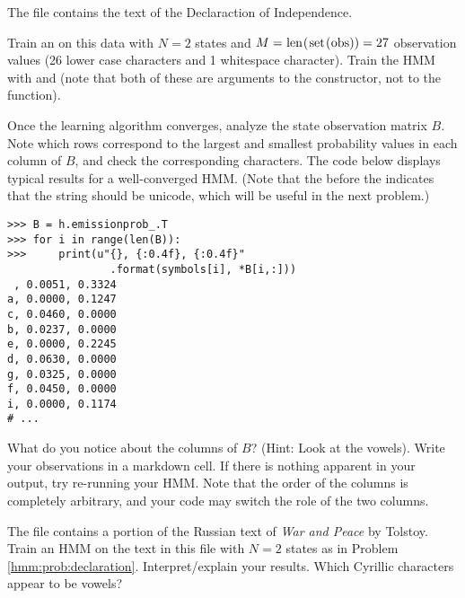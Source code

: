 \begin{problem}\label{hmm:prob:declaration}
The file  contains the text of the Declaraction of Independence.

Train an  on this data with $N=2$ states and $M=\text{\li{len(set(obs))}}=27$ observation values (26 lower case characters and 1 whitespace character).
Train the HMM with  and  (note that both of these are arguments to the constructor, not to the  function).

Once the learning algorithm converges, analyze the state observation matrix $B$.
Note which rows correspond to the largest and smallest probability values in each column of $B$,
and check the corresponding characters.
The code below displays typical results for a well-converged HMM.
(Note that the  before the  indicates that the string should be unicode, which will be useful in the next problem.)
\begin{lstlisting}
>>> B = h.emissionprob_.T
>>> for i in range(len(B)):
>>>     print(u"{}, {:0.4f}, {:0.4f}"
                .format(symbols[i], *B[i,:]))
 , 0.0051, 0.3324
a, 0.0000, 0.1247
c, 0.0460, 0.0000
b, 0.0237, 0.0000
e, 0.0000, 0.2245
d, 0.0630, 0.0000
g, 0.0325, 0.0000
f, 0.0450, 0.0000
i, 0.0000, 0.1174
# ...
\end{lstlisting}
What do you notice about the columns of $B$?
(Hint: Look at the vowels).
Write your observations in a markdown cell.
If there is nothing apparent in your output, try re-running your HMM.
Note that the order of the columns is completely arbitrary, and your code may switch the role of the two columns.
\end{problem}

\begin{comment}
\begin{problem}
Repeat the previous calculation with 3 hidden states.
Interpret/explain your results.
Note that as the number of hidden states increases, the divisions of the characters will become more abstract and less interpretable.

With 3 hidden states, you can use the following to display the matrix $B$:
\begin{lstlisting}
print(u"{}, {:0.4f}, {:0.4f}, {:0.4f}"
        .format(symbols[i], *hmm_example.B[i,:]))
\end{lstlisting}
\end{problem}
\end{comment}

\begin{problem}
The file  contains a portion of the Russian text of \textit{War and Peace} by Tolstoy.
Train an HMM on the text in this file with $N=2$ states as in Problem \ref{hmm:prob:declaration}.
Interpret/explain your results.
Which Cyrillic characters appear to be vowels?
\end{problem}

